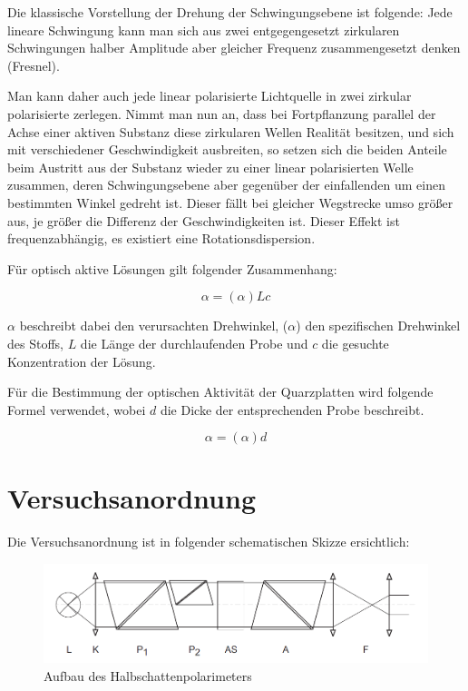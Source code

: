 \documentclass[11pt,ngerman]{scrartcl}
\begin{document}
Die klassische Vorstellung der Drehung der Schwingungsebene ist folgende: Jede lineare Schwingung
kann man sich aus zwei entgegengesetzt zirkularen Schwingungen halber Amplitude aber
gleicher Frequenz zusammengesetzt denken (Fresnel).

Man kann daher auch jede linear polarisierte Lichtquelle in zwei zirkular polarisierte zerlegen.
Nimmt man nun an, dass bei Fortpflanzung parallel der Achse einer aktiven Substanz diese
zirkularen Wellen Realität besitzen, und sich mit verschiedener Geschwindigkeit ausbreiten, so
setzen sich die beiden Anteile beim Austritt aus der Substanz wieder zu einer linear polarisierten
Welle zusammen, deren Schwingungsebene aber gegenüber der einfallenden um einen
bestimmten Winkel gedreht ist. Dieser fällt bei gleicher Wegstrecke umso größer aus, je größer
die Differenz der Geschwindigkeiten ist. Dieser Effekt ist frequenzabhängig, es existiert eine
Rotationsdispersion.

\newpage

Für optisch aktive Lösungen gilt folgender Zusammenhang:

\begin{equation}
	\alpha = (\alpha)Lc
	\label{eq:konz}
\end{equation}

$\alpha$ beschreibt dabei den verursachten Drehwinkel, ($\alpha$) den spezifischen Drehwinkel des Stoffs, $L$ die Länge der durchlaufenden Probe und $c$ die gesuchte Konzentration der Lösung.

\vspace{2mm}

Für die Bestimmung der optischen Aktivität der Quarzplatten wird folgende Formel verwendet, wobei $d$ die Dicke der entsprechenden Probe beschreibt.

\begin{equation}
	\alpha = (\alpha)d
	\label{eq:quarz}
\end{equation}


\section{Versuchsanordnung}\label{sec:Versuchsanordnung}

Die Versuchsanordnung ist in folgender schematischen Skizze ersichtlich:

\begin{figure}[H]
	\begin{center}
		\includegraphics[width=\textwidth]{abb1}
	\end{center}
	\caption{Aufbau des Halbschattenpolarimeters}
	\label{fig:abb1}
\end{figure}
\end{document}
